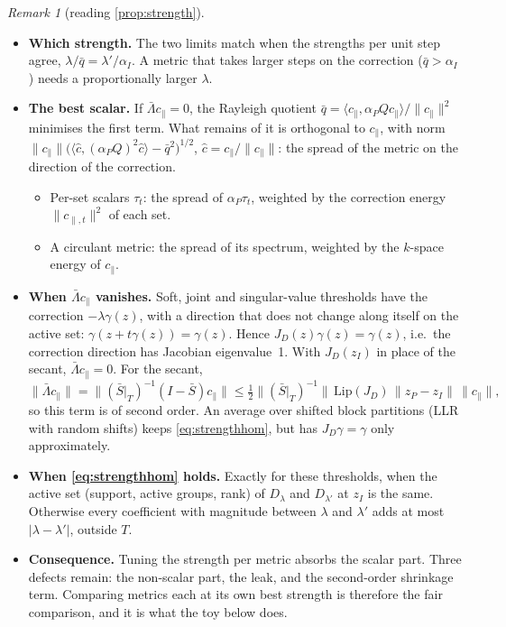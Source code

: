 \documentclass[11pt]{article}
\theoremstyle{definition}
\theoremstyle{remark}
\newtheorem{remark}[theorem]{Remark}
\newcommand{\inner}[2]{\langle #1,#2\rangle}
\newcommand{\norm}[1]{\lVert #1\rVert}
\begin{document}
\begin{remark}[reading \cref{prop:strength}]\label{rem:strength}
\begin{itemize}
\item \textbf{Which strength.} The two limits match when the strengths per unit step agree,
  $\lambda/\bar q=\lambda'/\alpha_I$. A metric that takes larger steps on the correction ($\bar q>\alpha_I$) needs a
  proportionally larger $\lambda$.
\item \textbf{The best scalar.} If $\bar\Lambda c_\parallel=0$, the Rayleigh quotient
  $\bar q=\inner{c_\parallel}{\alpha_PQc_\parallel}/\norm{c_\parallel}^2$ minimises the first term. What remains of it
  is orthogonal to $c_\parallel$, with norm
  $\norm{c_\parallel}\big(\inner{\hat c}{(\alpha_PQ)^2\hat c}-\bar q^2\big)^{1/2}$, $\hat c=c_\parallel/\norm{c_\parallel}$:
  the spread of the metric on the direction of the correction.
  \begin{itemize}
  \item Per-set scalars $\tau_t$: the spread of $\alpha_P\tau_t$, weighted by the correction energy
    $\norm{c_{\parallel,t}}^2$ of each set.
  \item A circulant metric: the spread of its spectrum, weighted by the $k$-space energy of $c_\parallel$.
  \end{itemize}
\item \textbf{When $\bar\Lambda c_\parallel$ vanishes.} Soft, joint and singular-value thresholds have the correction
  $-\lambda\gamma(z)$, with a direction that does not change along itself on the active set:
  $\gamma(z+t\gamma(z))=\gamma(z)$. Hence $J_D(z)\gamma(z)=\gamma(z)$, i.e.\ the correction direction has Jacobian
  eigenvalue~1. With $J_D(z_I)$ in place of the secant, $\bar\Lambda c_\parallel=0$. For the secant,
  \[
  \norm{\bar\Lambda c_\parallel}=\norm{(\bar S|_T)^{-1}(I-\bar S)c_\parallel}
  \leq\tfrac12\norm{(\bar S|_T)^{-1}}\,\mathrm{Lip}(J_D)\,\norm{z_P-z_I}\,\norm{c_\parallel},
  \]
  so this term is of second order. An average over shifted block partitions (LLR with random shifts) keeps
  \eqref{eq:strengthhom}, but has $J_D\gamma=\gamma$ only approximately.
\item \textbf{When \eqref{eq:strengthhom} holds.} Exactly for these thresholds, when the active set (support,
  active groups, rank) of $D_\lambda$ and $D_{\lambda'}$ at $z_I$ is the same. Otherwise every coefficient with
  magnitude between $\lambda$ and $\lambda'$ adds at most $\lvert\lambda-\lambda'\rvert$, outside $T$.
\item \textbf{Consequence.} Tuning the strength per metric absorbs the scalar part. Three defects remain: the
  non-scalar part, the leak, and the second-order shrinkage term. Comparing metrics each at its own best strength
  is therefore the fair comparison, and it is what the toy below does.
\end{itemize}
\end{remark}
\end{document}
